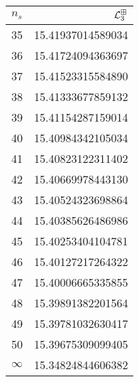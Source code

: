 \begin{tabular}[t]{|lr}
\toprule
  $n_{s}$ &  $\mathcal L^{\boxplus}_3$ \\
\midrule
       35 &                   15.41937014589034 \\
       36 &                   15.41724094363697 \\
       37 &                   15.41523315584890 \\
       38 &                   15.41333677859132 \\
       39 &                   15.41154287159014 \\
       40 &                   15.40984342105034 \\
       41 &                   15.40823122311402 \\
       42 &                   15.40669978443130 \\
       43 &                   15.40524323698864 \\
       44 &                   15.40385626486986 \\
       45 &                   15.40253404104781 \\
       46 &                   15.40127217264322 \\
       47 &                   15.40006665335855 \\
       48 &                   15.39891382201564 \\
       49 &                   15.39781032630417 \\
       50 &                   15.39675309099405 \\
 $\infty$ &                   15.34824844606382 \\
\bottomrule
\end{tabular}
